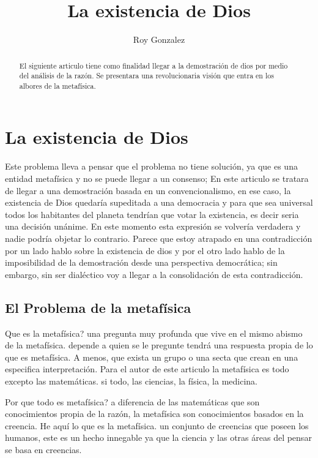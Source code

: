 \documentclass[12pt,letterpaper, a4paper ]{article}
\title{\Huge{La existencia de Dios}}
\author{Roy Gonzalez}
\begin{document}
\maketitle

\begin{abstract}
El siguiente articulo tiene como finalidad llegar a la demostración de dios por medio del análisis de la razón. Se presentara una revolucionaria visión que entra en los albores de la metafísica.
\end{abstract}

\section{La existencia de Dios}
Este problema lleva a pensar que el problema no tiene solución, ya que es una entidad metafísica y no se puede llegar a un consenso; En este articulo se tratara de llegar a una demostración basada en 
un convencionalismo, en ese caso, la existencia de Dios quedaría supeditada a una democracia y para que sea universal todos los habitantes del planeta tendrían que votar la existencia, es decir seria una decisión unánime.
En este momento esta expresión se volvería verdadera y nadie podría objetar lo contrario.
Parece que estoy atrapado en una contradicción por un lado hablo sobre la existencia de dios y por el otro lado hablo de la imposibilidad de la demostración desde una perspectiva democrática; sin embargo, sin ser
dialéctico voy a llegar a la consolidación de esta contradicción.


\subsection{El Problema de la metafísica}
 Que es la metafísica? una pregunta muy profunda que vive en el mismo abismo de la metafísica. depende a quien se le pregunte tendrá una respuesta propia de lo que es metafísica. A menos, que exista un grupo o una secta que
 crean en una especifica interpretación. Para el autor de este articulo la metafísica es todo excepto las matemáticas. si todo, las ciencias, la física, la medicina.
 
 Por que todo es metafísica? a diferencia de las matemáticas que son conocimientos propia de la razón, la metafísica son conocimientos basados en la creencia. He aquí lo que es la metafísica. un conjunto de creencias
 que poseen los humanos, este es un hecho innegable ya que la ciencia y las otras áreas del pensar se basa en creencias.
 
\end{document}
